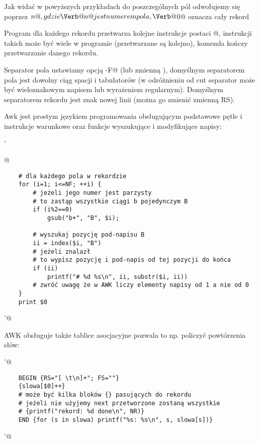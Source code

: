 Jak widać w powyższych przykładach do poszczególnych pól odwołujemy się poprzez \Verb@$n@,
gdzie \Verb@n@ jest numerem pola, \Verb@$0@ oznacza cały rekord

Program dla każdego rekordu przetwarza kolejne instrukcje postaci @,
instrukcji takich może być wiele w programie (przetwarzane są kolejno),
komenda \Verb@next@ kończy przetwarzanie danego rekordu.

Separator pola ustawiamy opcją \Verb@-F@ (lub zmienną \Verb@FS@),
domyślnym separatorem pola jest dowolny ciąg spacji i tabulatorów
(w odróżnieniu od cut separator może być wieloznakowym napisem lub wyrażeniem regularnym).
Domyślnym separatorem rekordu jest znak nowej linii (można go zmienić zmienną RS).

Awk jest prostym językiem programowania obsługującym podstawowe pętle i instrukcje warunkowe
oraz funkcje wyszukujące i modyfikujące napisy:

\begin{oframed}\noindent{}\Verb@ '{@\vspace{-0.95em}
\begin{verbatim}
	# dla każdego pola w rekordzie
	for (i=1; i<=NF; ++i) {
		# jeżeli jego numer jest parzysty
		# to zastąp wszystkie ciągi b pojedynczym B
		if (i%2==0)
			gsub("b+", "B", $i);
		
		# wyszukaj pozycję pod-napisu B
		ii = index($i, "B")
		# jeżeli znalazł
		# to wypisz pozycję i pod-napis od tej pozycji do końca
		if (ii)
			printf("# %d %s\n", ii, substr($i, ii))
		# zwróć uwagę że w AWK liczy elementy napisy od 1 a nie od 0
	}
	print $0
\end{verbatim}
\vspace{-0.95em}\Verb@}'@\end{oframed}

\noindent
AWK obsługuje także tablice asocjacyjne pozwala to np. policzyć powtórzenia słów:

\begin{oframed}\noindent{}\Verb@ '@\vspace{-0.95em}
\begin{verbatim}
	BEGIN {RS="[ \t\n]+"; FS=""}
	{slowa[$0]++}
	# może być kilka bloków {} pasujących do rekordu
	# jeżeli nie użyjemy next przetworzone zostaną wszystkie
	# {printf("rekord: %d done\n", NR)}
	END {for (s in slowa) printf("%s: %s\n", s, slowa[s])}
\end{verbatim}
\vspace{-0.95em}\Verb@'@\end{oframed}

